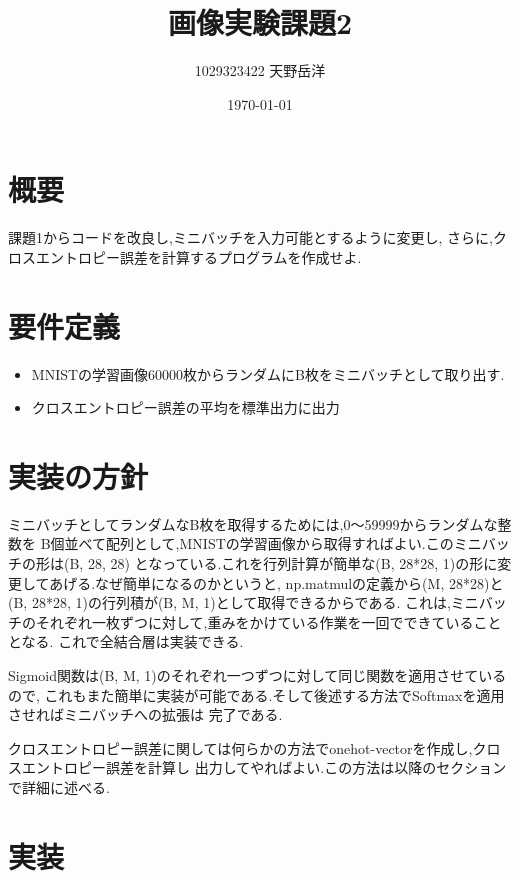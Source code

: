 \documentclass[a4paper,11pt]{jsarticle}
\begin{document}
\title{画像実験課題2}
\author{1029323422 天野岳洋}
\date{\today}
\maketitle
\clearpage

\section{概要}
課題1からコードを改良し,ミニバッチを入力可能とするように変更し,
さらに,クロスエントロピー誤差を計算するプログラムを作成せよ.

\section{要件定義}
\begin{itemize}
  \item MNISTの学習画像60000枚からランダムにB枚をミニバッチとして取り出す.
  \item クロスエントロピー誤差の平均を標準出力に出力
\end{itemize}

\section{実装の方針}
ミニバッチとしてランダムなB枚を取得するためには,0～59999からランダムな整数を
B個並べて配列として,MNISTの学習画像から取得すればよい.このミニバッチの形は(B, 28, 28)
となっている.これを行列計算が簡単な(B, 28*28, 1)の形に変更してあげる.なぜ簡単になるのかというと,
np.matmulの定義から(M, 28*28)と(B, 28*28, 1)の行列積が(B, M, 1)として取得できるからである.
これは,ミニバッチのそれぞれ一枚ずつに対して,重みをかけている作業を一回でできていることとなる.
これで全結合層は実装できる.

Sigmoid関数は(B, M, 1)のそれぞれ一つずつに対して同じ関数を適用させているので,
これもまた簡単に実装が可能である.そして後述する方法でSoftmaxを適用させればミニバッチへの拡張は
完了である.
\par 
クロスエントロピー誤差に関しては何らかの方法でonehot-vectorを作成し,クロスエントロピー誤差を計算し
出力してやればよい.この方法は以降のセクションで詳細に述べる.

\section{実装}
\end{document}
